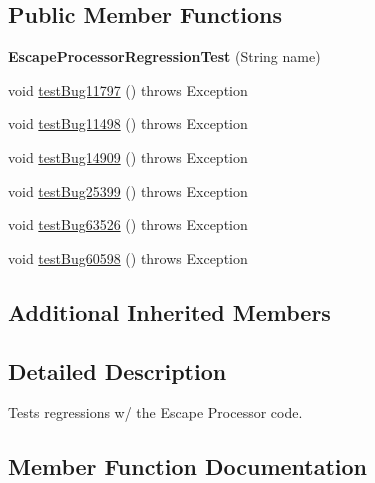 \subsection*{Public Member Functions}
\begin{DoxyCompactItemize}
\item 
\mbox{\label{classtestsuite_1_1regression_1_1_escape_processor_regression_test_aa7a16c7210646feaa7dd9843498289f1}} 
{\bfseries Escape\+Processor\+Regression\+Test} (String name)
\item 
void \mbox{\hyperlink{classtestsuite_1_1regression_1_1_escape_processor_regression_test_afce160178129cd6e5455a7da48112250}{test\+Bug11797}} ()  throws Exception 
\item 
void \mbox{\hyperlink{classtestsuite_1_1regression_1_1_escape_processor_regression_test_acee42ee99c924af2e40d07cf935cc3a2}{test\+Bug11498}} ()  throws Exception 
\item 
void \mbox{\hyperlink{classtestsuite_1_1regression_1_1_escape_processor_regression_test_ae70f225ac0aefbe783d3f4a137c0b66d}{test\+Bug14909}} ()  throws Exception 
\item 
void \mbox{\hyperlink{classtestsuite_1_1regression_1_1_escape_processor_regression_test_a807fc950104890375b5291b116c9c45a}{test\+Bug25399}} ()  throws Exception 
\item 
void \mbox{\hyperlink{classtestsuite_1_1regression_1_1_escape_processor_regression_test_a372b0f782e66be889f1351b24530cdc0}{test\+Bug63526}} ()  throws Exception 
\item 
void \mbox{\hyperlink{classtestsuite_1_1regression_1_1_escape_processor_regression_test_a39062afbb30ff8c361ed8fdfaad6f971}{test\+Bug60598}} ()  throws Exception 
\end{DoxyCompactItemize}
\subsection*{Additional Inherited Members}


\subsection{Detailed Description}
Tests regressions w/ the Escape Processor code. 

\subsection{Member Function Documentation}
\mbox{\label{classtestsuite_1_1regression_1_1_escape_processor_regression_test_acee42ee99c924af2e40d07cf935cc3a2}} 
